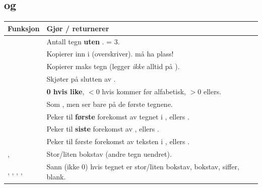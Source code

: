 \subsection{\texorpdfstring{}{string.h} og \texorpdfstring{}{ctype.h}}
\begin{center}
\small\renewcommand{\arraystretch}{1.08}
\begin{tabular}{@{}L{4.6cm}L{11.0cm}@{}}
\toprule
\textbf{Funksjon} & \textbf{Gjør / returnerer} \\
\midrule
{} & Antall tegn \textbf{uten} .  = 3. \\
 & Kopierer  inn i  (overskriver).  må ha plass! \\
 & Kopierer maks  tegn (legger \emph{ikke} alltid på ). \\
 & Skjøter  på slutten av . \\
 & \textbf{0 hvis like}, $<0$ hvis  kommer før  alfabetisk, $>0$ ellers. \\
 & Som , men ser bare på de  første tegnene. \\
 & Peker til \textbf{første} forekomst av tegnet  i , ellers . \\
 & Peker til \textbf{siste} forekomst av , ellers . \\
 & Peker til første forekomst av teksten  i , ellers . \\
\midrule
{},  & Stor/liten bokstav (andre tegn uendret). \\
, , , ,  & Sann (ikke 0) hvis tegnet er stor/liten bokstav, bokstav, siffer, blank. \\
\bottomrule
\end{tabular}
\end{center}


